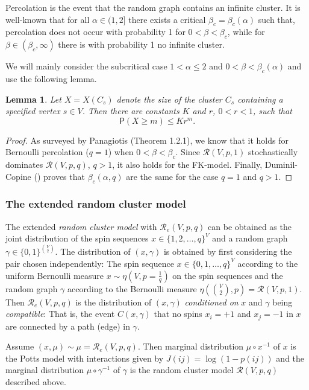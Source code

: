 \documentclass[11pt, a4paper]{amsart}
\newtheorem{lem}[thm]{Lemma}
\theoremstyle{definition}
\theoremstyle{remark}
\providecommand{\mscr}{\mathscr}
\renewcommand{\P}{\mathsf{P}}
\providecommand{\g}{\gamma}
\begin{document}
Percolation is the event that the random graph contains an infinite cluster. 
It is well-known \cite{ACCN} that for all $\alpha\in(1,2]$
there exists a critical $\beta_c=\beta_c(\alpha)$
such that, percolation does not occur with probability 1 for $0<\beta<\beta_c$, 
while for $\beta\in(\beta_c,\infty)$ there is with probability 1
no infinite cluster.     

We will mainly consider the subcritical case $1<\alpha\le 2$ and $0<\beta <\beta_c(\alpha)$ and use the following lemma. 
\begin{lem}\label{geometric-bound}
 Let $X=X(C_s)$ denote the size of the cluster $C_s$ 
 containing a specified vertex $s\in V$. Then there are constants 
 $K$ and $r$, $0<r<1$, such that $$\P(X\ge m)\le K r^{m}. $$ 
\end{lem}
\begin{proof}
  As surveyed by Panagiotis \cite{pan} (Theorem 1.2.1), we know that it
  holds for Bernoulli percolation ($q=1$) when $0<\beta<\beta_c$. Since $\mscr R(V,p,1)$
  stochastically dominates $\mscr R(V,p,q)$, $q>1$, it also holds for the
  FK-model. Finally, Duminil-Copine (\cite{duminil}) proves that $\beta_c(\alpha,q)$ are
  the same for the case $q=1$ and $q>1$.
\end{proof}

\subsubsection{The extended random cluster model}
The extended \emph{random cluster model} with $\mscr R_e(V,p,q)$ can be obtained
as the joint distribution of the spin sequences $x\in\{1,2,\dots,q\}^{V}$ and a
random graph $\gamma\in\{0,1\}^{\binom V2}$. The distribution of $(x,\gamma)$ is obtained by
first considering the pair chosen independently: The spin sequence
$x\in\{0,1,\dots,q\}^{V}$ according to the uniform Bernoulli measure
$x\sim\eta(V,p=\frac1q)$ on the spin sequences and the random graph $\gamma$ according to
the Bernoulli measure $\eta(\binom V2, p)=\mscr R(V,p,1)$. Then $\mscr R_e(V,p,q)$
is the distribution of $(x,\gamma)$ \emph{conditioned on} $x$ and $\gamma$ being
\emph{compatible}: That is, the event $C(x,\g)$ that no spins $x_i=+1$ and
$x_j=-1$ in $x$ are connected by a path (edge) in $\g$.

Assume $(x,\mu)\sim\mu=\mscr R_e(V,p,q)$. Then marginal distribution $\mu\circ x^{-1}$ of $x$
is the Potts model with interactions given by $J(ij)=\log(1-p(ij))$ and the
marginal distribution $\mu\circ\gamma^{-1}$ of $\gamma$ is the random cluster model
$\mscr R(V,p,q)$ described above.
\end{document}

